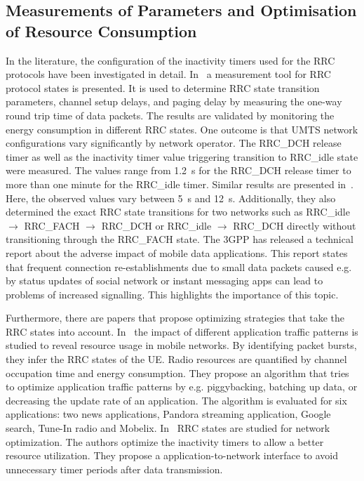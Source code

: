 \subsection{Measurements of  Parameters and Optimisation of Resource Consumption}\label{sec:network:background:measurement_optimisation}

In the literature, the configuration of the inactivity timers used for the \gls{RRC} protocols have been investigated in detail.
In~\cite{Perala2009} a measurement tool for \gls{RRC} protocol states is presented. 
It is used to determine \gls{RRC} state transition parameters, channel setup delays, and paging delay by measuring the one-way round trip time of data packets.
The results are validated by monitoring the energy consumption in different \gls{RRC} states.
One outcome is that \gls{UMTS} network configurations vary significantly by network operator.
The \gls{RRC_DCH} release timer as well as the inactivity timer value triggering transition to \gls{RRC_idle} state were measured.
The values range from \SI{1.2}{\second} for the \gls{RRC_DCH} release timer to more than one minute for the \gls{RRC_idle} timer.
Similar results are presented in~\cite{Qian2010a}.
Here, the observed values vary between \SI{5}{\second} and \SI{12}{\second}. 
Additionally, they also determined the exact \gls{RRC} state transitions for two networks such as \gls{RRC_idle} \(\rightarrow\) \gls{RRC_FACH} \(\rightarrow\) \gls{RRC_DCH} or \gls{RRC_idle} \(\rightarrow\) \gls{RRC_DCH} directly without transitioning through the \gls{RRC_FACH} state.
The \gls{3GPP} has released a technical report \cite{3GPP_22801} about the adverse impact of mobile data applications.
This report states that frequent connection re-establishments due to small data packets caused e.g. by status updates of social network or instant messaging apps can lead to problems of increased signalling.
This highlights the importance of this topic.

Furthermore, there are papers that propose optimizing strategies that take the \gls{RRC} states into account. 
In~\cite{Qian2011} the impact of different application traffic patterns is studied to reveal resource usage in mobile networks.
By identifying packet bursts, they infer the \gls{RRC} states of the \gls{UE}.
Radio resources are quantified by channel occupation time and energy consumption.
They propose an algorithm that tries to optimize application traffic patterns by e.g. piggybacking, batching up data, or decreasing the update rate of an application.
The algorithm is evaluated for six applications: two news applications, Pandora streaming application, Google search, Tune-In radio and Mobelix. 
In~\cite{Qian2010b} \gls{RRC} states are studied for network optimization.
The authors optimize the inactivity timers to allow a better resource utilization. 
They propose a application-to-network interface to avoid unnecessary timer periods after data transmission.


